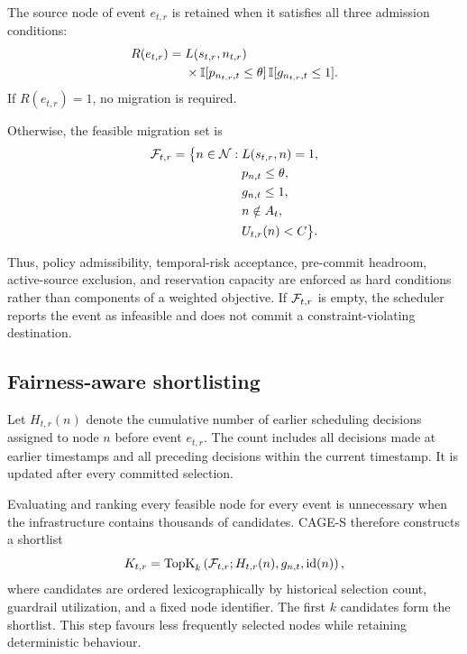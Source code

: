The source node of event $e_{t,r}$ is retained when it satisfies all
three admission conditions:
\begin{equation}
\label{eq:retain-source}
\begin{split}
    R(e_{t,r})
    ={}&
    L(s_{t,r},n_{t,r})\\
    &{}\times
    \mathbb{I}[p_{n_{t,r},t}\leq\theta]\,
    \mathbb{I}[g_{n_{t,r},t}\leq1].
\end{split}
\end{equation}
If $R(e_{t,r})=1$, no migration is required.

Otherwise, the feasible migration set is
\begin{equation}
\label{eq:feasible}
\begin{split}
    \mathcal{F}_{t,r}
    =
    \big\{
        n\in\mathcal{N}:
        &\;L(s_{t,r},n)=1,\\
        &\;p_{n,t}\leq\theta,\\
        &\;g_{n,t}\leq1,\\
        &\;n\notin A_t,\\
        &\;U_{t,r}(n)<C
    \big\}.
\end{split}
\end{equation}

Thus, policy admissibility, temporal-risk acceptance, pre-commit
headroom, active-source exclusion, and reservation capacity are enforced
as hard conditions rather than components of a weighted objective. If
$\mathcal{F}_{t,r}$ is empty, the scheduler reports the event as infeasible and
does not commit a constraint-violating destination.

\subsection{Fairness-aware shortlisting}

Let $H_{t,r}(n)$ denote the cumulative number of earlier scheduling
decisions assigned to node $n$ before event $e_{t,r}$. The count includes
all decisions made at earlier timestamps and all preceding decisions
within the current timestamp. It is updated after every committed
selection.

Evaluating and ranking every feasible node for every event is
unnecessary when the infrastructure contains thousands of candidates.
CAGE-S therefore constructs a shortlist
\begin{equation}
\label{eq:shortlist}
    K_{t,r}
    =
    \operatorname{TopK}_{k}
    \left(
        \mathcal{F}_{t,r};
        H_{t,r}(n),
        g_{n,t},
        \operatorname{id}(n)
    \right),
\end{equation}
where candidates are ordered lexicographically by historical selection
count, guardrail utilization, and a fixed node identifier. The first
$k$ candidates form the shortlist. This step favours less frequently
selected nodes while retaining deterministic behaviour.

